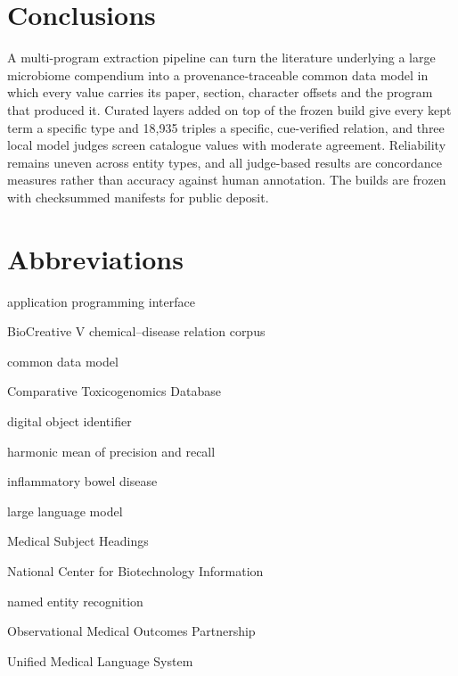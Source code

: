 \documentclass[referee,lineno,pdflatex,sn-vancouver-num]{sn-jnl}
\theoremstyle{thmstyleone}%
\theoremstyle{thmstyletwo}%
\theoremstyle{thmstylethree}%
\begin{document}
\section{Conclusions}\label{sec:conclusions}
A multi-program extraction pipeline can turn the literature underlying a
large microbiome compendium into a provenance-traceable common data model
in which every value carries its paper, section, character offsets and
the program that produced it. Curated layers added on top of the frozen
build give every kept term a specific type and 18,935 triples a specific,
cue-verified relation, and three local model judges screen catalogue
values with moderate agreement. Reliability remains uneven across entity
types, and all judge-based results are concordance measures rather than
accuracy against human annotation. The builds are frozen with checksummed
manifests for public deposit.

\backmatter

\section*{Abbreviations}
\begin{list}{}{%
  \setlength{\labelwidth}{6.5em}%
  \setlength{\labelsep}{0.5em}%
  \setlength{\leftmargin}{7em}%
  \setlength{\itemsep}{0pt}%
  \setlength{\parsep}{0pt}%
  \setlength{\topsep}{2pt}%
  \renewcommand{\makelabel}[1]{\textbf{#1}\hfill}}
\item[API] application programming interface
\item[BC5CDR] BioCreative V chemical--disease relation corpus
\item[CDM] common data model
\item[CTD] Comparative Toxicogenomics Database
\item[DOI] digital object identifier
\item[F1] harmonic mean of precision and recall
\item[IBD] inflammatory bowel disease
\item[LLM] large language model
\item[MeSH] Medical Subject Headings
\item[NCBI] National Center for Biotechnology Information
\item[NER] named entity recognition
\item[OMOP] Observational Medical Outcomes Partnership
\item[UMLS] Unified Medical Language System
\end{list}
\end{document}
